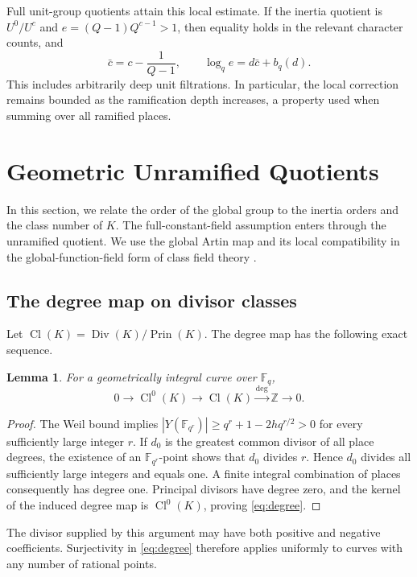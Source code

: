 \documentclass[12pt,onecolumn,draftclsnofoot,letterpaper]{IEEEtran}
\newtheorem{lemma}{Lemma}
\theoremstyle{remark}
\newcommand{\F}{\mathbb F}
\newcommand{\Z}{\mathbb Z}
\newcommand{\Cl}{\operatorname{Cl}}
\newcommand{\Div}{\operatorname{Div}}
\newcommand{\Prin}{\operatorname{Prin}}
\begin{document}
Full unit-group quotients attain this local estimate. If the inertia quotient is $U^0/U^c$ and $e=(Q-1)Q^{c-1}>1$, then equality holds in the relevant character counts, and
\begin{equation}
 \bar c=c-\frac1{Q-1},\qquad
 \log_qe=d\bar c+b_q(d).
 \label{eq:localequality}
\end{equation}
This includes arbitrarily deep unit filtrations. In particular, the local correction remains bounded as the ramification depth increases, a property used when summing over all ramified places.

\section{Geometric Unramified Quotients}\label{sec:global}
In this section, we relate the order of the global group to the inertia orders and the class number of $K$. The full-constant-field assumption enters through the unramified quotient. We use the global Artin map and its local compatibility in the global-function-field form of class field theory \cite[Ths.~21, 22, and 29]{li}.

\subsection{The degree map on divisor classes}
Let $\Cl(K)=\Div(K)/\Prin(K)$. The degree map has the following exact sequence.
\begin{lemma}\label{lem:degree}
For a geometrically integral curve over $\F_q$,
\begin{equation}
 0\longrightarrow\Cl^0(K)\longrightarrow\Cl(K)
 \xrightarrow{\deg}\Z\longrightarrow0.
 \label{eq:degree}
\end{equation}
\end{lemma}
\begin{proof}
The Weil bound implies $|Y(\F_{q^r})|\ge q^r+1-2h q^{r/2}>0$ for every sufficiently large integer $r$. If $d_0$ is the greatest common divisor of all place degrees, the existence of an $\F_{q^r}$-point shows that $d_0$ divides $r$. Hence $d_0$ divides all sufficiently large integers and equals one. A finite integral combination of places consequently has degree one. Principal divisors have degree zero, and the kernel of the induced degree map is $\Cl^0(K)$, proving \eqref{eq:degree}.
\end{proof}
The divisor supplied by this argument may have both positive and negative coefficients. Surjectivity in \eqref{eq:degree} therefore applies uniformly to curves with any number of rational points.
\end{document}

